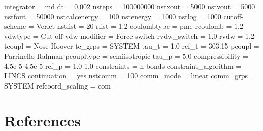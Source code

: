 \documentclass[
  letterpaper,
  DIV=11,
  numbers=noendperiod]{scrartcl}
\newenvironment{Shaded}{\begin{snugshade}}{\end{snugshade}}
\newcommand{\ExtensionTok}[1]{\textcolor[rgb]{0.00,0.46,0.62}{#1}}
\newcommand{\NormalTok}[1]{\textcolor[rgb]{0.00,0.46,0.62}{#1}}
\begin{document}
\begin{Shaded}
\begin{Highlighting}[]
\ExtensionTok{integrator}\NormalTok{              = md}
\ExtensionTok{dt}\NormalTok{                      = 0.002}
\ExtensionTok{nsteps}\NormalTok{                  = 100000000}
\ExtensionTok{nstxout}\NormalTok{                 = 5000}
\ExtensionTok{nstvout}\NormalTok{                 = 5000}
\ExtensionTok{nstfout}\NormalTok{                 = 50000}
\ExtensionTok{nstcalcenergy}\NormalTok{           = 100}
\ExtensionTok{nstenergy}\NormalTok{               = 1000}
\ExtensionTok{nstlog}\NormalTok{                  = 1000}
\ExtensionTok{cutoff{-}scheme}\NormalTok{           = Verlet}
\ExtensionTok{nstlist}\NormalTok{                 = 20}
\ExtensionTok{rlist}\NormalTok{                   = 1.2}
\ExtensionTok{coulombtype}\NormalTok{             = pme}
\ExtensionTok{rcoulomb}\NormalTok{                = 1.2}
\ExtensionTok{vdwtype}\NormalTok{                 = Cut{-}off}
\ExtensionTok{vdw{-}modifier}\NormalTok{            = Force{-}switch}
\ExtensionTok{rvdw\_switch}\NormalTok{             = 1.0}
\ExtensionTok{rvdw}\NormalTok{                    = 1.2}
\ExtensionTok{tcoupl}\NormalTok{                  = Nose{-}Hoover}
\ExtensionTok{tc\_grps}\NormalTok{                 = SYSTEM}
\ExtensionTok{tau\_t}\NormalTok{                   = 1.0}
\ExtensionTok{ref\_t}\NormalTok{                   = 303.15}
\ExtensionTok{pcoupl}\NormalTok{                  = Parrinello{-}Rahman}
\ExtensionTok{pcoupltype}\NormalTok{              = semiisotropic}
\ExtensionTok{tau\_p}\NormalTok{                   = 5.0}
\ExtensionTok{compressibility}\NormalTok{         = 4.5e{-}5  4.5e{-}5}
\ExtensionTok{ref\_p}\NormalTok{                   = 1.0     1.0}
\ExtensionTok{constraints}\NormalTok{             = h{-}bonds}
\ExtensionTok{constraint\_algorithm}\NormalTok{    = LINCS}
\ExtensionTok{continuation}\NormalTok{            = yes}
\ExtensionTok{nstcomm}\NormalTok{                 = 100}
\ExtensionTok{comm\_mode}\NormalTok{               = linear}
\ExtensionTok{comm\_grps}\NormalTok{               = SYSTEM}
\ExtensionTok{refcoord\_scaling}\NormalTok{        = com}
\end{Highlighting}
\end{Shaded}

\hypertarget{references}{%
\section*{References}\label{references}}
\end{document}

